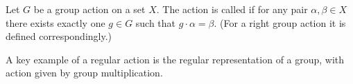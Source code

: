 \documentclass[12pt]{article}
\begin{document}
Let $G$ be a group action on a set $X$.
The action is called  if for any pair $\alpha, \beta \in X$ there
exists exactly one $g \in G$ such that $g \cdot \alpha = \beta$. (For a
right
group action it is defined correspondingly.)

A key example of a regular action is the regular representation of a group, with action given by group multiplication.
\end{document}
